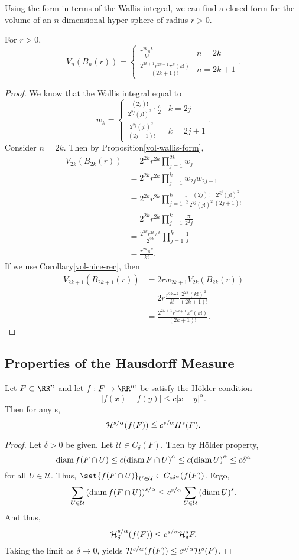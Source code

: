 Using the form in terms of the Wallis integral, we can find a closed form for the volume of an $n$-dimensional hyper-sphere of radius $r>0$.
\begin{thm}
	For $r>0$,
	\[
		V_n(B_n(r)) =
		\begin{cases}
			\frac{r^{2k}\pi^k}{k!} & n=2k\\
			\frac{2^{2k+1}r^{2k+1}\pi^k (k!)}{(2k+1)!} & n=2k+1
		\end{cases}.
	\]
\end{thm}
\begin{proof}
	We know that the Wallis integral equal to
	\[
		w_k =
		\begin{cases}
			\frac{(2j)!}{2^{2j}(j!)^2}\cdot \frac{\pi}{2} & k=2j\\
			\frac{2^{2j}(j!)^2}{(2j+1)!} & k=2j+1
		\end{cases}.
	\]
	Consider $n = 2k$.
	Then by Proposition\autoref{vol-wallis-form},
	\begin{align*}
		V_{2k}(B_{2k}(r))&=2^{2k} r^{2k} \prod_{j=1}^{2k} w_j\\
		&=2^{2k} r^{2k} \prod_{j=1}^{k} w_{2j}w_{2j-1}\\
		&=2^{2k} r^{2k} \prod_{j=1}^{k} \frac{\pi}{2}\frac{(2j)!}{2^{2j}(j!)^2}\frac{2^{2j}(j!)^2}{(2j+1)!}\\
		&=2^{2k} r^{2k}\prod_{j=1}^{k}\frac{\pi}{2^2 j}\\
		&=\frac{2^{2k} r^{2k} \pi^k}{2^{2k}}\prod_{j=1}^k\frac{1}{j}\\
		&=\frac{r^{2k} \pi^k}{k!}.
	\end{align*}
	If we use Corollary\autoref{vol-nice-rec}, then
	\begin{align*}
		V_{2k+1}(B_{2k+1}(r))&=2rw_{2k+1}V_{2k}(B_{2k}(r))\\
		&=2r\frac{r^{2k} \pi^k}{k!}\frac{2^{2k}(k!)^2}{(2k+1)!}\\
		&=\frac{2^{2k+1}r^{2k+1}\pi^k(k!)}{(2k+1)!}.
	\end{align*}
\end{proof}
\subsection{Properties of the Hausdorff Measure}

\begin{thm}\label{hm-holder}
	Let $F\subset\RR^n$ and let $f: F\rightarrow\RR^m$ be satisfy the H\"older condition
	\[
		|f(x)-f(y)| \leq c|x-y|^\alpha.
	\]
	Then for any s,
	\[
		\mathcal{H}^{s/\alpha}(f(F))\leqq c^{s/\alpha}H^s(F).
	\]
\end{thm}
\begin{proof}
	Let $\delta>0$ be given.
	Let $\mathcal{U}\in C_\delta(F)$.
	Then by H\"older property,
	\[
		\operatorname{diam} f(F\cap U)\leq c{(\operatorname{diam} F\cap U)}^\alpha \leq c{(\operatorname{diam} U)}^\alpha\leq c\delta^\alpha
	\]
	for all $U\in\mathcal{U}$.
	Thus, $\set{f(F\cap U)}_{U\in\mathcal U}\in C_{c\delta^\alpha}(f(F))$.
	Ergo,
	\[
		\sum_{U\in\mathcal{U}} {(\operatorname{diam} f(F\cap U))}^{s/\alpha}\leq c^{s/\alpha}\sum_{U\in\mathcal{U}}{(\operatorname{diam} U)}^s.
	\]
	And thus,
	\[
		\mathcal{H}^{s/\alpha}_\delta (f(F)) \leq c^{s/\alpha}\mathcal{H}^s_\delta F.
	\]
	Taking the limit as $\delta\rightarrow 0$, yields $\mathcal{H}^{s/\alpha}(f(F))\leq c^{s/\alpha}\mathcal{H}^s(F)$.
\end{proof}

